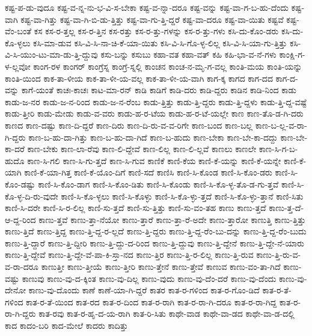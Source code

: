 {ಕಷ್ಟ-ಪ-ಡು-ವುದೂ
ಕಷ್ಟ-ವ-ನ್ನ-ನು-ಭ-ವಿ-ಸ-ಬೇಕಾ
ಕಷ್ಟ-ವ-ನ್ನಾ-ದರೂ
ಕಷ್ಟ-ವನ್ನು
ಕಷ್ಟ-ವಾ-ಗ-ಬ-ಹು-ದೆಂದು
ಕಷ್ಟ-ವಾಗಿ
ಕಷ್ಟ-ವಾ-ಗಿತ್ತು
ಕಷ್ಟ-ವಾ-ಗಿ-ಬಿ-ಡು-ತ್ತಿತ್ತು
ಕಷ್ಟ-ವಾ-ಗು-ತ್ತಿ-ದ್ದರೆ
ಕಷ್ಟ-ವಾ-ದರೂ
ಕಷ್ಟ-ವಾ-ಯಿತು
ಕಷ್ಟವೆ
ಕಷ್ಟ-ವೆಂ-ಬಂತೆ
ಕಸ
ಕಸ-ರ-ತ್ತಲ್ಲ
ಕಸ-ರ-ತ್ತಿನ
ಕಸ-ರತ್ತು
ಕಸ-ರ-ತ್ತು-ಗಳನ್ನು
ಕಸ-ರ-ತ್ತು-ಗಳು
ಕಸಿ-ದು-ಕೊಂ-ಡರು
ಕಸಿ-ದು-ಕೊ-ಳ್ಳಲು
ಕಸಿ-ಮಾ-ಡುವ
ಕಸಿ-ವಿ-ಸಿ-ನಾ-ಚಿ-ಕೆ-ಯಾ-ಯಿತು
ಕಸಿ-ವಿ-ಸಿ-ಗೊ-ಳ್ಳ-ಲಿಲ್ಲ
ಕಸಿ-ವಿ-ಸಿ-ಯಾ-ಗು-ತ್ತಿತ್ತು
ಕಸಿ-ವಿ-ಸಿ-ಯುಂ-ಟು-ಮಾ-ಡು-ತ್ತಿ-ದ್ದುವು
ಕಸು-ಬನ್ನು
ಕಸುಬು
ಕಹಾ-ವತ
ಕಹಾ-ವತ್
ಕಹಿ
ಕಹಿ-ಭಾ-ವ-ನೆ-ಗಳು
ಕಾಂಕ್ಷಿ-ಗ-ಳ-ಲ್ಲವೋ
ಕಾಂಗ-ರಳ
ಕಾಂಗರ್
ಕಾಂಗ್ರೆಸ್ನ
ಕಾಂಗ್ರೆ-ಸ್ನಲ್ಲಿ
ಕಾಂಚನ
ಕಾಂಚ-ನ-ಮೃ-ಗ-ವಲ್ಲ
ಕಾಂತಿ-ಮಯ
ಕಾಂತಿ-ಯನ್ನು
ಕಾಂತಿ-ಯಿಂದ
ಕಾಕ-ತಾ-ಳೀಯ
ಕಾಕ-ತಾ-ಳೀ-ಯ-ವಲ್ಲ
ಕಾಕ-ತಾ-ಳೀ-ಯ-ವಾಗಿ
ಕಾಗ-ಕ್ಕ
ಕಾಗದ
ಕಾಗ-ದದ
ಕಾಗ-ದ-ವನ್ನು
ಕಾಗೆ-ಯಂತೆ
ಕಾಚಃ-ಕಾಚಃ
ಕಾಟ-ಮಾ-ರನ್
ಕಾಡಿ
ಕಾಡಿಗೆ
ಕಾಡಿ-ದರು
ಕಾಡಿ-ದ್ದರು
ಕಾಡಿನ
ಕಾಡಿ-ನಿಂದ
ಕಾಡು
ಕಾಡು-ಜ-ನರ
ಕಾಡು-ಜ-ನ-ರಿಂದ
ಕಾಡು-ಜ-ನ-ರೆಂಬ
ಕಾಡು-ತ್ತಿತ್ತು
ಕಾಡು-ತ್ತಿ-ದ್ದರು
ಕಾಡು-ತ್ತಿ-ದ್ದಳು
ಕಾಡು-ತ್ತಿ-ದ್ದ-ವಷ್ಟೆ
ಕಾಡು-ತ್ತೀರಿ
ಕಾಡು-ಮೇಡು
ಕಾಡು-ವ-ವರು
ಕಾಡು-ಹ-ರ-ಟೆಯ
ಕಾಡು-ಹ-ರ-ಟೆ-ಯಲ್ಲೇ
ಕಾಣ
ಕಾಣ-ತೊ-ಡ-ಗಿ-ದರು
ಕಾಣದ
ಕಾಣ-ದಷ್ಟು
ಕಾಣ-ದಿ-ದ್ದರೆ
ಕಾಣ-ದಿರು
ಕಾಣ-ದಿ-ರು-ವ-ವ-ರಿಗೇ
ಕಾಣ-ಬಂದ
ಕಾಣ-ಬಲ್ಲ
ಕಾಣ-ಬ-ಲ್ಲ-ವ-ರಾ-ಗಿ-ದ್ದರು
ಕಾಣ-ಬ-ಹು-ದಾ-ಗಿತ್ತು
ಕಾಣ-ಬ-ಹು-ದಾ-ಗಿದೆ
ಕಾಣ-ಬ-ಹುದು
ಕಾಣ-ಬೇಕಾ
ಕಾಣ-ಬೇ-ಕಾ-ದದ್ದು
ಕಾಣ-ಬೇ-ಕಾ-ದರೆ
ಕಾಣ-ಬೇಕು
ಕಾಣ-ಲಾ-ರೆವು
ಕಾಣ-ಲಿ-ದ್ದೇವೆ
ಕಾಣ-ಲಿಲ್ಲ
ಕಾಣ-ಲಿ-ಲ್ಲವೆ
ಕಾಣಲು
ಕಾಣಲೇ
ಕಾಣ-ಸಿ-ಗ-ಬ-ಹುದೊ
ಕಾಣ-ಸಿ-ಗಲಿ
ಕಾಣ-ಸಿ-ಗು-ತ್ತದೆ
ಕಾಣ-ಸಿ-ಗುವ
ಕಾಣಿಕೆ
ಕಾಣಿ-ಕೆಯ
ಕಾಣಿ-ಕೆ-ಯನ್ನು
ಕಾಣಿ-ಕೆ-ಯನ್ನೇ
ಕಾಣಿ-ಕೆ-ಯಾಗಿ
ಕಾಣಿ-ಕೆ-ಯಾ-ಗಿತ್ತ
ಕಾಣಿ-ಕೆ-ಯೊಂ-ದಿಗೆ
ಕಾಣಿ-ಸದೆ
ಕಾಣಿಸಿ
ಕಾಣಿ-ಸಿ-ಕೊಂಡ
ಕಾಣಿ-ಸಿ-ಕೊಂ-ಡರು
ಕಾಣಿ-ಸಿ-ಕೊಂ-ಡಷ್ಟು
ಕಾಣಿ-ಸಿ-ಕೊಂ-ಡಾಗ
ಕಾಣಿ-ಸಿ-ಕೊಂ-ಡಿತು
ಕಾಣಿ-ಸಿ-ಕೊಂಡು
ಕಾಣಿ-ಸಿ-ಕೊ-ಳ್ಳ-ತೊ-ಡ-ಗು-ತ್ತವೆ
ಕಾಣಿ-ಸಿ-ಕೊ-ಳ್ಳ-ದಿ-ರು-ವುದೇ
ಕಾಣಿ-ಸಿ-ಕೊ-ಳ್ಳಲು
ಕಾಣಿ-ಸಿ-ಕೊಳ್ಳು
ಕಾಣಿ-ಸಿ-ಕೊ-ಳ್ಳು-ತ್ತದೆ
ಕಾಣಿ-ಸಿ-ಕೊ-ಳ್ಳು-ತ್ತಾನೆ
ಕಾಣಿ-ಸಿತು
ಕಾಣಿ-ಸಿ-ದರೇ
ಕಾಣಿ-ಸಿ-ರ-ಲಿಲ್ಲ
ಕಾಣಿ-ಸು-ತ್ತದೆ
ಕಾಣಿ-ಸು-ತ್ತಿತ್ತು
ಕಾಣಿ-ಸು-ವಂ-ತಹ
ಕಾಣು
ಕಾಣು-ತ್ತದೆ
ಕಾಣು-ತ್ತ-ದೆ-ಆ-ದ್ದ-ರಿಂದ
ಕಾಣು-ತ್ತವೆ
ಕಾಣು-ತ್ತಾ-ನೆಯೋ
ಕಾಣು-ತ್ತಾರೆ
ಕಾಣು-ತ್ತಾ-ರೆ-ಅದೇ
ಕಾಣು-ತ್ತಾರೋ
ಕಾಣುತ್ತಿ
ಕಾಣು-ತ್ತಿತ್ತು
ಕಾಣು-ತ್ತಿದೆ
ಕಾಣು-ತ್ತಿದ್ದ
ಕಾಣು-ತ್ತಿ-ದ್ದ-ರ-ಲ್ಲದೆ
ಕಾಣು-ತ್ತಿ-ದ್ದರು
ಕಾಣು-ತ್ತಿ-ದ್ದ-ರೆಂ-ಬು-ದನ್ನು
ಕಾಣು-ತ್ತಿ-ದ್ದ-ರೆಂ-ಬುದು
ಕಾಣು-ತ್ತಿ-ದ್ದಾರೆ
ಕಾಣು-ತ್ತಿ-ದ್ದೀರಿ
ಕಾಣು-ತ್ತಿ-ದ್ದು-ದ-ರಿಂದ
ಕಾಣು-ತ್ತಿ-ದ್ದುವು
ಕಾಣು-ತ್ತಿ-ದ್ದೇನೆ
ಕಾಣು-ತ್ತಿ-ದ್ದೇ-ನೆ-ಯಾರು
ಕಾಣು-ತ್ತಿ-ದ್ದೇವೆ
ಕಾಣು-ತ್ತಿ-ದ್ದೇ-ವೆ-ಪಾ-ಕಿ-ಸ್ತಾ-ನದ
ಕಾಣು-ತ್ತಿರ
ಕಾಣು-ತ್ತಿ-ರ-ಲಿಲ್ಲ
ಕಾಣು-ತ್ತಿ-ರುವ
ಕಾಣು-ತ್ತಿ-ರು-ವ-ವ-ರಾ-ದರೂ
ಕಾಣುತ್ತೀ
ಕಾಣು-ತ್ತೀಯೆ
ಕಾಣು-ತ್ತೀರಿ
ಕಾಣು-ತ್ತೇನೆ
ಕಾಣು-ತ್ತೇವೆ
ಕಾಣುವ
ಕಾಣು-ವಂ-ತಾ-ಗಿದೆ
ಕಾಣು-ವಷ್ಟು
ಕಾಣುವು
ಕಾಣು-ವು-ದ-ಕ್ಕಿಂತ
ಕಾಣು-ವು-ದಿಲ್ಲ
ಕಾಣು-ವುದು
ಕಾಣು-ವು-ದೆಂ-ದರೆ
ಕಾಣು-ವು-ದೆಂದು
ಕಾಣು-ವು-ದೇನೋ
ಕಾಣು-ವು-ದೊಂದು
ಕಾಣೆ
ಕಾಣೆ-ಯಾ-ಗಿ-ದ್ದರೆ
ಕಾತರ
ಕಾತ-ರ-ಗಳಿಂದ
ಕಾತ-ರ-ಗೊಂ-ಡಿದೆ
ಕಾತ-ರ-ತೆ-ಗಳಿಂದ
ಕಾತ-ರ-ತೆ-ಯಿಂದ
ಕಾತ-ರದ
ಕಾತ-ರ-ದಿಂದ
ಕಾತ-ರ-ರಾಗಿ
ಕಾತ-ರ-ರಾ-ಗಿ-ದರೂ
ಕಾತ-ರ-ರಾ-ಗಿದ್ದ
ಕಾತ-ರ-ರಾ-ಗಿ-ದ್ದರು
ಕಾತ-ರವು
ಕಾತ-ರ-ಹೃ-ದ-ಯ-ರಾಗಿ
ಕಾತ-ರಿ-ಸಿತು
ಕಾಥೇ-ವಾಡ
ಕಾಥೇ-ವಾ-ಡದ
ಕಾಥೇ-ವಾ-ಡ-ದಲ್ಲಿ
ಕಾದ
ಕಾದಂ-ಬರಿ
ಕಾದ-ಮೇಲೆ
ಕಾದರು
ಕಾದಿತ್ತು
}
